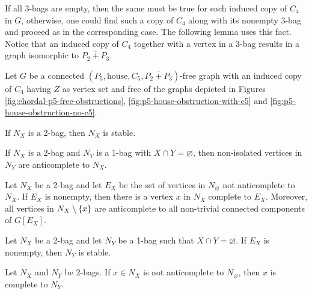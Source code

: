 If all 3-bags are empty, then the same must be true for each induced copy of
$C_4$ in $G$, otherwise, one could find such a copy of $C_4$ along with its
nonempty 3-bag and proceed as in the corresponding case. The following lemma
uses this fact.   Notice that an induced copy of $C_4$ together with a vertex in
a $3$-bag results in a graph isomorphic to $\overline{P_2 + P_3}$.

\begin{lemma}
    Let $G$ be a connected $(P_5,\text{house},C_5, \overline{P_2 + P_3})$-free
    graph with an induced copy of $C_4$ having $Z$ as vertex set and free of the
    graphs depicted in Figures \ref{fig:chordal-p5-free-obstructions},
    \ref{fig:p5-house-obstruction-with-c5} and
    \ref{fig:p5-house-obstruction-no-c5}.
    \begin{lemenum}
        \item If $N_X$ is a 2-bag, then $N_X$ is stable. \label{lem:type_16}
        \item If $N_X$ is a 2-bag and $N_Y$ is a 1-bag with $X\cap Y
            =\varnothing$, then non-isolated vertices in $N_Y$ are anticomplete
            to $N_X$. \label{lem:type_14}
        \item Let $N_X$ be a 2-bag and let $E_X$ be the set of vertices in
            $N_\varnothing$ not anticomplete to $N_X$. If $E_X$ is nonempty,
            then there is a vertex $x$ in $N_X$ complete to $E_X$. Moreover, all
            vertices in $N_X\setminus \left\{x\right\}$ are anticomplete to all non-trivial
            connected components of $G[E_X]$. \label{lem:type_17}
        \item Let $N_X$ be a 2-bag and let $N_Y$ be a 1-bag such that $X\cap Y =
            \varnothing$. If $E_X$ is nonempty, then $N_Y$ is stable.
            \label{lem:type_18}
        \item Let $N_X$ and $N_Y$ be 2-bags. If $x\in N_X$ is not anticomplete
            to $N_\varnothing$, then $x$ is complete to $N_Y$.
            \label{lem:type_19}
    \end{lemenum} 
\end{lemma}

